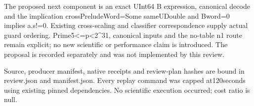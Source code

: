 \documentclass[10pt]{article}
\begin{document}
The proposed next component is an exact UInt64 B expression, canonical decode and the implication crossPreludeWord=Some sameUDouble and Bword=0 implies a.s!=0. Existing cross-scaling and classifier correspondence supply actual guard ordering. Prime5<=p<2^31, canonical inputs and the no-table n1 route remain explicit; no new scientific or performance claim is introduced. The proposal is recorded separately and was not implemented by this review.

Source, producer manifest, native receipts and review-plan hashes are bound in review.json and manifest.json. Every replay command was capped at120seconds using existing pinned dependencies. No scientific execution occurred; cost ratio is null.
\end{document}
